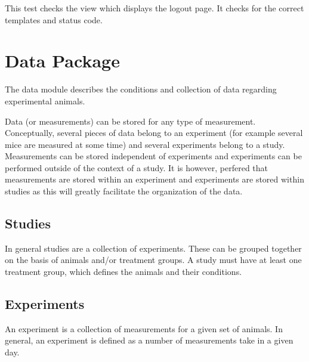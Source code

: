 \documentclass[letterpaper,10pt,english]{sphinxmanual}
\begin{document}
\begin{fulllineitems}
\begin{fulllineitems}
\end{fulllineitems}


\begin{fulllineitems}
\label{api:mousedb.tests.RootViewTests.test_logout}
This test checks the view which displays the logout page.  It checks for the correct templates and status code.

\end{fulllineitems}


\end{fulllineitems}



\section{Data Package}
\label{api:data-package}\label{api:module-mousedb.data}
The data module describes the conditions and collection of data regarding experimental animals.

Data (or measurements) can be stored for any type of measurement.  Conceptually, several pieces of data belong to an experiment (for example several mice are measured at some time) and several experiments belong to a study.  Measurements can be stored independent of experiments and experiments can be performed outside of the context of a study.  It is however, perfered that measurements are stored within an experiment and experiments are stored within studies as this will greatly facilitate the organization of the data.


\subsection{Studies}
\label{api:studies}
In general studies are a collection of experiments.  These can be grouped together on the basis of animals and/or treatment groups.  A study must have at least one treatment group, which defines the animals and their conditions.


\subsection{Experiments}
\label{api:experiments}
An experiment is a collection of measurements for a given set of animals.  In general, an experiment is defined as a number of measurements take in a given day.
\end{document}
